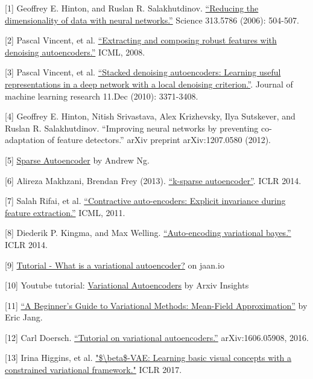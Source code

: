 {[}1{]} Geoffrey E. Hinton, and Ruslan R. Salakhutdinov. \href{https://pdfs.semanticscholar.org/c50d/ca78e97e335d362d6b991ae0e1448914e9a3.pdf}{``Reducing the dimensionality of data with neural networks.''} Science 313.5786 (2006): 504-507.

{[}2{]} Pascal Vincent, et al. \href{http://www.cs.toronto.edu/~larocheh/publications/icml-2008-denoising-autoencoders.pdf}{``Extracting and composing robust features with denoising autoencoders.''} ICML, 2008.

{[}3{]} Pascal Vincent, et al. \href{http://www.jmlr.org/papers/volume11/vincent10a/vincent10a.pdf}{``Stacked denoising autoencoders: Learning useful representations in a deep network with a local denoising criterion.''}. Journal of machine learning research 11.Dec (2010): 3371-3408.

{[}4{]} Geoffrey E. Hinton, Nitish Srivastava, Alex Krizhevsky, Ilya Sutskever, and Ruslan R. Salakhutdinov. ``Improving neural networks by preventing co-adaptation of feature detectors.'' arXiv preprint arXiv:1207.0580 (2012).

{[}5{]} \href{https://web.stanford.edu/class/cs294a/sparseAutoencoder.pdf}{Sparse Autoencoder} by Andrew Ng.

{[}6{]} Alireza Makhzani, Brendan Frey (2013). \href{https://arxiv.org/abs/1312.5663}{``k-sparse autoencoder''}. ICLR 2014.

{[}7{]} Salah Rifai, et al. \href{http://www.icml-2011.org/papers/455_icmlpaper.pdf}{``Contractive auto-encoders: Explicit invariance during feature extraction.''} ICML, 2011.

{[}8{]} Diederik P. Kingma, and Max Welling. \href{https://arxiv.org/abs/1312.6114}{``Auto-encoding variational bayes.''} ICLR 2014.

{[}9{]} \href{https://jaan.io/what-is-variational-autoencoder-vae-tutorial/}{Tutorial - What is a variational autoencoder?} on jaan.io

{[}10{]} Youtube tutorial: \href{https://www.youtube.com/watch?v=9zKuYvjFFS8}{Variational Autoencoders} by Arxiv Insights

{[}11{]} \href{https://blog.evjang.com/2016/08/variational-bayes.html}{``A Beginner's Guide to Variational Methods: Mean-Field Approximation''} by Eric Jang.

{[}12{]} Carl Doersch. \href{https://arxiv.org/abs/1606.05908}{``Tutorial on variational autoencoders.''} arXiv:1606.05908, 2016.

{[}13{]} Irina Higgins, et al. \href{https://openreview.net/forum?id=Sy2fzU9gl}{"\$\textbackslash beta\$-VAE: Learning basic visual concepts with a constrained variational framework."} ICLR 2017.

